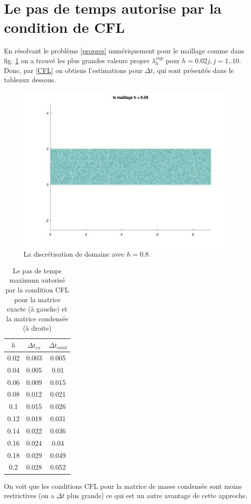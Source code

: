 \documentclass[12pt]{article}
\begin{document}
	\section{Le pas de temps autorise par la condition de CFL}
	En résolvant le problème \eqref{propres} numériquement pour le maillage comme dans fig. \ref{fig:maillage1} on a trouvé les plus grandes valeurs propre $\lambda^{sup}_h$ pour $h = 0.02j, j = 1..10$. Donc, par \eqref{CFL} on obtiens l'estimations pour $\Delta t$, qui sont présentés dans le tableaux dessous.
	\begin{figure}[h]
		\centering
		\includegraphics[height=0.4\linewidth]{images/maillage1}
		\caption{La discrétisation de domaine  avec $h = 0.8$.}
		\label{fig:maillage1}
	\end{figure}
	\begin{table}[H]
		\caption{\label{tab:canonsummary} Le pas de temps maximum autorisé par la condition CFL pour la matrice exacte (à gauche) et la matrice condensée (à droite)}
		\begin{center}
			\begin{tabular}{|c|c|c|}
				\hline
				$h$ & $\Delta t_{ex}$ & $\Delta t_{cond}$ \\
				\hline
				0.02 & 0.003 &  0.005 \\ 
				0.04 & 0.005 & 0.01 \\
				0.06 & 0.009 & 0.015\\
				0.08 & 0.012 & 0.021\\
				0.1  & 0.015 & 0.026\\
				0.12 & 0.018 & 0.031\\
				0.14 & 0.022 & 0.036\\
				0.16 & 0.024 & 0.04\\
				0.18 & 0.029 & 0.049\\
				0.2  & 0.028 & 0.052\\
				\hline
			\end{tabular}
		\end{center}
	\end{table} 
	On voit que les conditions CFL pour la matrice de masse condensée sont moins restrictives (on a $\Delta t$ plus grands) ce qui est un autre avantage de cette approche.
\end{document}
